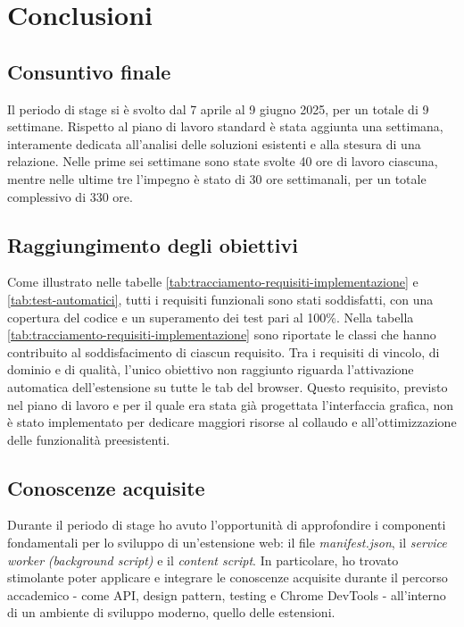 \chapter{Conclusioni}
\label{cap:conclusioni}

\section{Consuntivo finale}

\par Il periodo di stage si è svolto dal 7 aprile al 9 giugno 2025, per un totale di 9 settimane. Rispetto al piano di lavoro standard è stata aggiunta una settimana, interamente dedicata all’analisi delle soluzioni esistenti e alla stesura di una relazione. Nelle prime sei settimane sono state svolte 40 ore di lavoro ciascuna, mentre nelle ultime tre l’impegno è stato di 30 ore settimanali, per un totale complessivo di 330 ore.

\section{Raggiungimento degli obiettivi}

\par Come illustrato nelle tabelle \ref{tab:tracciamento-requisiti-implementazione} e \ref{tab:test-automatici}, tutti i requisiti funzionali sono stati soddisfatti, con una copertura del codice e un superamento dei test pari al 100\%. Nella tabella \ref{tab:tracciamento-requisiti-implementazione} sono riportate le classi che hanno contribuito al soddisfacimento di ciascun requisito. Tra i requisiti di vincolo, di dominio e di qualità, l’unico obiettivo non raggiunto riguarda l’attivazione automatica dell’estensione su tutte le tab del browser. Questo requisito, previsto nel piano di lavoro e per il quale era stata già progettata l’interfaccia grafica, non è stato implementato per dedicare maggiori risorse al collaudo e all’ottimizzazione delle funzionalità preesistenti.

\section{Conoscenze acquisite}

\par Durante il periodo di stage ho avuto l’opportunità di approfondire i componenti fondamentali per lo sviluppo di un’estensione web: il file \textit{manifest.json}, il \textit{service worker} \textit{(background script)} e il \textit{content script}. In particolare, ho trovato stimolante poter applicare e integrare le conoscenze acquisite durante il percorso accademico - come API, design pattern, testing e Chrome DevTools - all’interno di un ambiente di sviluppo moderno, quello delle estensioni.

